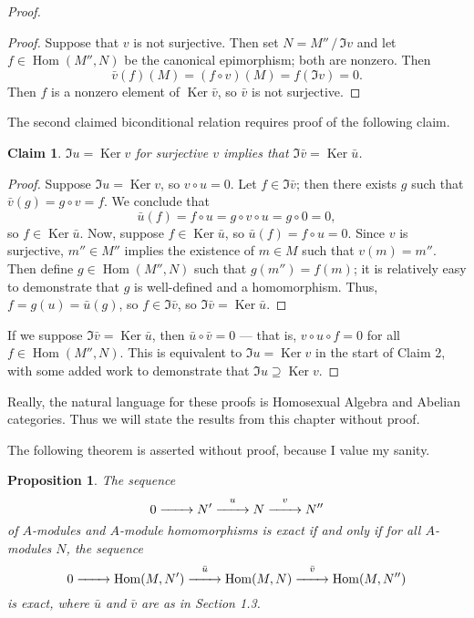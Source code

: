 \documentclass[11pt]{article}
\newtheorem{proposition}{Proposition}
\newtheorem{claim}{Claim}
\newcommand{\Hom}{\operatorname{Hom}}
\newcommand{\Ker}{\operatorname{Ker}}
\renewcommand{\longrightarrow}{\xrightarrow{\hspace*{0.7cm}}}
\begin{document}
\begin{adjustwidth}{0.5cm}{}
\begin{proof}
\begin{adjustwidth}{0.5cm}{}
\begin{proof}
				Suppose that $v$ is not surjective. Then set $N = M'' \,/\, \Im v$ and let $f \in \Hom(M'', N)$ be the canonical epimorphism; both are nonzero. Then
				\[
					\bar{v}(f)(M) = (f \circ v)(M) = f(\Im v) = 0.
				\]
				Then $f$ is a nonzero element of $\Ker \bar{v}$, so $\bar{v}$ is not surjective.
			\end{proof}
		\end{adjustwidth}
		The second claimed biconditional relation requires proof of the following claim.
		\begin{adjustwidth}{0.5cm}{}
			\begin{claim}
				$\Im u = \Ker v$ for surjective $v$ implies that $\Im \bar{v} = \Ker \bar{u}$.
			\end{claim}
			\begin{proof}\renewcommand{\qedsymbol}{}
				Suppose $\Im u = \Ker v$, so $v \circ u = 0$. Let $f \in \Im \bar{v}$; then there exists $g$ such that $\bar{v}(g) = g \circ v = f$. We conclude that
				\[
					\bar{u}(f) = f \circ u = g \circ v \circ u = g \circ 0 = 0,
				\]
				so $f \in \Ker \bar{u}$. Now, suppose $f \in \Ker \bar{u}$, so $\bar{u}(f) = f \circ u = 0$. Since $v$ is surjective, $m'' \in M''$ implies the existence of $m \in M$ such that $v(m) = m''$. Then define $g \in \Hom(M'', N)$ such that $g(m'') = f(m)$; it is relatively easy to demonstrate that $g$ is well-defined and a homomorphism. Thus, $f = g(u) = \bar{u}(g)$, so $f \in \Im \bar{v}$, so $\Im \bar{v} = \Ker \bar{u}$.
			\end{proof}
		\end{adjustwidth}
		If we suppose $\Im \bar{v} = \Ker \bar{u}$, then $\bar{u} \circ \bar{v} = 0$ --- that is, $v \circ u \circ f = 0$ for all $f \in \Hom(M'', N)$. This is equivalent to $\Im u = \Ker v$ in the start of Claim 2, with some added work to demonstrate that $\Im u \supseteq \Ker v$.
	\end{proof}
\end{adjustwidth}

Really, the natural language for these proofs is Homosexual Algebra and Abelian categories. Thus we will state the results from this chapter without proof.

\newpage

The following theorem is asserted without proof, because I value my sanity.

\begin{adjustwidth}{0.5cm}{}
  \begin{proposition}
		The sequence
		\[
			0 \longrightarrow N' \stackrel{u}{\longrightarrow} N \stackrel{v}{\longrightarrow} N''
    \]
		of $A$-modules and $A$-module homomorphisms is exact if and only if for all $A$-modules $N$, the sequence
		\[
			0 \longrightarrow \Hom(M, N') \stackrel{\bar{u}}{\longrightarrow} \Hom(M, N) \stackrel{\bar{v}}{\longrightarrow} \Hom(M, N'')
    \]
		is exact, where $\bar{u}$ and $\bar{v}$ are as in Section 1.3.
  \end{proposition}
\end{adjustwidth}
\end{document}
